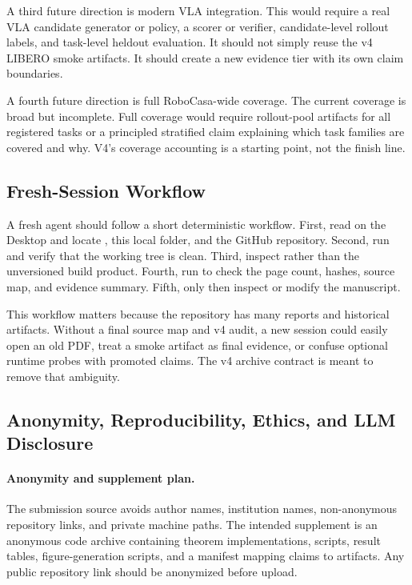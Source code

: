 A third future direction is modern VLA integration. This would require a real
VLA candidate generator or policy, a scorer or verifier, candidate-level
rollout labels, and task-level heldout evaluation. It should not simply reuse
the v4 LIBERO smoke artifacts. It should create a new evidence tier with its
own claim boundaries.

A fourth future direction is full RoboCasa-wide coverage. The current coverage
is broad but incomplete. Full coverage would require rollout-pool artifacts for
all registered tasks or a principled stratified claim explaining which task
families are covered and why. V4's coverage accounting is a starting point, not
the finish line.

\subsection{Fresh-Session Workflow}
\label{app:fresh-session}

A fresh agent should follow a short deterministic workflow. First, read
 on the Desktop and locate
, this local folder, and the GitHub repository.
Second, run  and verify that the working tree
is clean. Third, inspect  rather than
the unversioned build product. Fourth, run 
to check the page count, hashes, source map, and evidence summary. Fifth, only
then inspect or modify the manuscript.

This workflow matters because the repository has many reports and historical
artifacts. Without a final source map and v4 audit, a new session could easily
open an old PDF, treat a smoke artifact as final evidence, or confuse optional
runtime probes with promoted claims. The v4 archive contract is meant to
remove that ambiguity.

\subsection{Anonymity, Reproducibility, Ethics, and LLM Disclosure}
\label{app:statements}

\paragraph{Anonymity and supplement plan.}
The submission source avoids author names, institution names, non-anonymous repository links, and private machine paths. The intended supplement is an anonymous code archive containing theorem implementations, scripts, result tables, figure-generation scripts, and a manifest mapping claims to artifacts. Any public repository link should be anonymized before upload.

